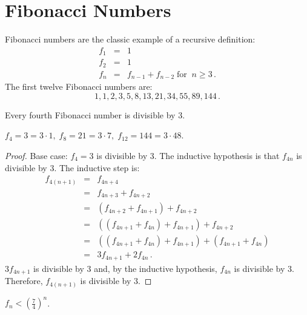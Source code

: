 
\section{Fibonacci Numbers}\label{s.induction-fibonacci}
Fibonacci numbers are the classic example of a recursive definition:
\begin{eqnarray*}
f_1 &=& 1\\
f_2 &=& 1\\
f_n &=& f_{n-1} + f_{n-2}\; \textrm{for} \;\; n \geq 3\,.
\end{eqnarray*}
The first twelve Fibonacci numbers are:
\[
1, 1, 2, 3, 5, 8, 13, 21, 34, 55, 89, 144\,.
\]
\begin{theorem}\label{thm.fib-div3}
Every fourth Fibonacci number is divisible by $3$.
\end{theorem}

\begin{example}
$f_4=3=3\cdot 1,\; f_8=21=3\cdot 7,\; f_{12}=144=3\cdot 48$.
\end{example}

\begin{proof}
Base case: $f_4=3$ is divisible by $3$. The inductive hypothesis is that $f_{4n}$ is divisible by $3$. The inductive step is:
\begin{eqnarray*}
f_{4(n+1)} &=& f_{4n+4}\\
&=& f_{4n+3}+f_{4n+2}\\
&=& (f_{4n+2}+f_{4n+1})+f_{4n+2}\\
&=& ((f_{4n+1}+f_{4n})+f_{4n+1})+f_{4n+2}\\
&=& ((f_{4n+1}+f_{4n})+f_{4n+1})+(f_{4n+1}+f_{4n})\\
&=& 3f_{4n+1}+2f_{4n}\,.
\end{eqnarray*}
$3f_{4n+1}$ is divisible by $3$ and, by the inductive hypothesis, $f_{4n}$ is divisible by $3$. Therefore, $f_{4(n+1)}$ is divisible by $3$.
\end{proof}

\newpage

\begin{theorem}\label{thm.seven-fourths}
$f_n < \left(\displaystyle\frac{7}{4}\right)^n$.
\end{theorem}

